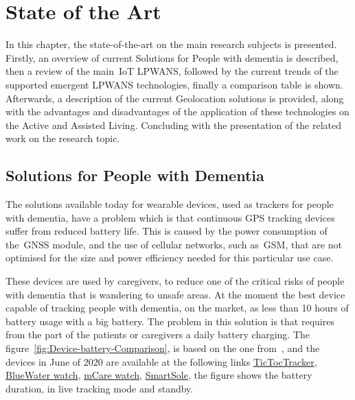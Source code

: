 \chapter{State of the Art}
\label{cha:state_of_the_art}

In this chapter, the state-of-the-art on the main research subjects is presented. 
Firstly, an overview of current Solutions for People with dementia is described, then a review of the main~\gls{IoT} LPWANS, followed by the current trends of the supported emergent LPWANS technologies, finally a comparison table is shown. 
Afterwards, a description of the current Geolocation solutions is provided, along with the advantages and disadvantages of the application of these technologies on the Active and Assisted Living. Concluding with the presentation of the related work on the research topic.

\section{Solutions for People with Dementia}
\label{sec:PWD_SOTA}


The solutions available today  for wearable devices, used as trackers for people with dementia, have a problem which is that continuous GPS tracking devices suffer from reduced battery life. This is caused by the power consumption of the~\gls{GNSS} module,  and the use of cellular networks, such as~\gls{GSM}, that are not optimised for the size and power efficiency needed for this particular use case. 

These devices are  used by caregivers, to reduce  one of the critical risks of people with dementia that is wandering to unsafe areas. At the moment the best device capable of tracking people with dementia,  on the market, as less than 10 hours of battery usage with a big battery.
The problem in this solution is that  requires from the part of the  patients or caregivers a daily battery charging.
The figure~\ref{fig:Device-battery-Comparison}, is based on the one from~\cite{Hadwen2017}, and the devices in June of 2020 are available at the following links \href{https://www.tictoctrack.com.au/}{TicTocTracker}, \href{http://www.bluewatersecurityprofessionals.com/elderlytracking.htm}{BlueWater watch},  \href{https://mcarewatch.com.au/}{mCare watch}, \href{https://gpssmartsole.com/gpssmartsole/}{SmartSole}, the figure shows the battery duration, in live tracking mode and  standby.\newline\newline\newline\newline\newline

